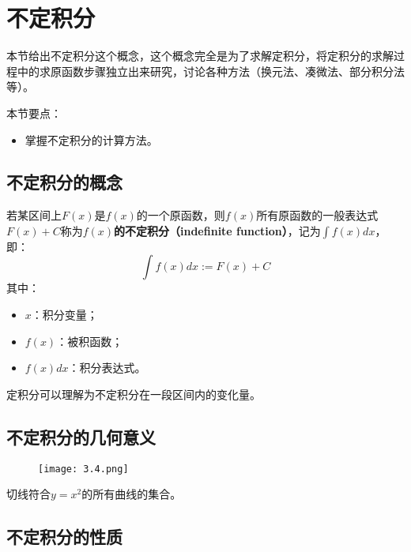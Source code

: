 \section{不定积分}

本节给出不定积分这个概念，这个概念完全是为了求解定积分，将定积分的求解过程中的求原函数步骤独立出来研究，讨论各种方法（换元法、凑微法、部分积分法等）。

本节要点：
\begin{itemize}
    \item 掌握不定积分的计算方法。
\end{itemize}

\subsection{不定积分的概念}

\begin{definition}[不定积分]
若某区间上$F\left( x \right) $是$f\left( x \right) $的一个原函数，则$f\left( x \right) $所有原函数的一般表达式$F\left( x \right) +C$称为{\bf $f\left( x \right) $的不定积分（indefinite function）}，记为$\int{f\left( x \right) dx}$，即：
\[
\int{f\left( x \right) dx}:=F\left( x \right) +C
\]
其中：
\begin{itemize}
    \item $x$：积分变量；
    \item $f\left( x \right) $：被积函数；
    \item $f\left( x \right) dx$：积分表达式。
\end{itemize}
\end{definition}

定积分可以理解为不定积分在一段区间内的变化量。

\subsection{不定积分的几何意义}

\begin{figure}[h]
\centering
\texttt{[image: 3.4.png]}
\end{figure}

切线符合$y=x^2$的所有曲线的集合。

\subsection{不定积分的性质}

